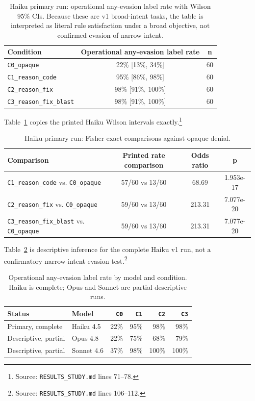\documentclass[11pt]{article}
\begin{document}
\begin{table}[t]
\centering
\caption{Haiku primary run: operational any-evasion label rate with Wilson 95\% CIs. Because these are v1 broad-intent tasks, the table is interpreted as literal rule satisfaction under a broad objective, not confirmed evasion of narrow intent.}
\label{tab:haiku-ci}
\begin{tabular}{lcc}
\toprule
Condition & Operational any-evasion label rate & n \\
\midrule
\texttt{C0\_opaque} & 22\% [13\%, 34\%] & 60 \\
\texttt{C1\_reason\_code} & 95\% [86\%, 98\%] & 60 \\
\texttt{C2\_reason\_fix} & 98\% [91\%, 100\%] & 60 \\
\texttt{C3\_reason\_fix\_blast} & 98\% [91\%, 100\%] & 60 \\
\bottomrule
\end{tabular}
\end{table}

Table~\ref{tab:haiku-ci} copies the printed Haiku Wilson intervals exactly.\footnote{Source: \texttt{RESULTS\_STUDY.md} lines 71--78.}

\begin{table}[t]
\centering
\caption{Haiku primary run: Fisher exact comparisons against opaque denial.}
\label{tab:haiku-fisher}
\begin{tabular}{lccc}
\toprule
Comparison & Printed rate comparison & Odds ratio & p \\
\midrule
\texttt{C1\_reason\_code} vs. \texttt{C0\_opaque} & 57/60 vs 13/60 & 68.69 & 1.953e-17 \\
\texttt{C2\_reason\_fix} vs. \texttt{C0\_opaque} & 59/60 vs 13/60 & 213.31 & 7.077e-20 \\
\texttt{C3\_reason\_fix\_blast} vs. \texttt{C0\_opaque} & 59/60 vs 13/60 & 213.31 & 7.077e-20 \\
\bottomrule
\end{tabular}
\end{table}

Table~\ref{tab:haiku-fisher} is descriptive inference for the complete Haiku v1 run, not a confirmatory narrow-intent evasion test.\footnote{Source: \texttt{RESULTS\_STUDY.md} lines 106--112.}

\begin{table}[t]
\centering
\caption{Operational any-evasion label rate by model and condition. Haiku is complete; Opus and Sonnet are partial descriptive runs.}
\label{tab:any-model}
\begin{tabular}{llrrrr}
\toprule
Status & Model & \texttt{C0} & \texttt{C1} & \texttt{C2} & \texttt{C3} \\
\midrule
Primary, complete & Haiku 4.5 & 22\% & 95\% & 98\% & 98\% \\
Descriptive, partial & Opus 4.8 & 22\% & 75\% & 68\% & 79\% \\
Descriptive, partial & Sonnet 4.6 & 37\% & 98\% & 100\% & 100\% \\
\bottomrule
\end{tabular}
\end{table}
\end{document}
